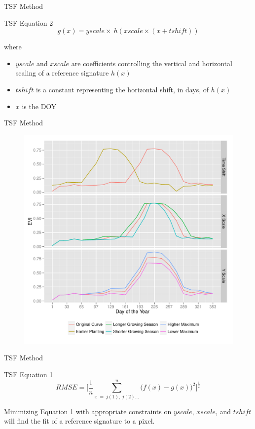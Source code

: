 \documentclass[  compress,xcolor={usenames,dvipsnames}]{beamer}
\begin{document}
\begin{frame}{TSF Method}
\begin{block}{TSF Equation 2}
  \begin{equation*}
    g(x) = yscale\times~h\left(xscale\times(x + tshift)\right)
  \end{equation*}
\end{block}
\vspace{0.5\baselineskip}
where
\begin{itemize}
  \item $yscale$ and  $xscale$ are coefficients controlling the vertical and horizontal scaling of a reference signature $h(x)$
  \item $tshift$ is a constant representing the horizontal shift, in days, of $h(x)$
  \item $x$ is the DOY
\end{itemize}
\end{frame}

\begin{frame}{TSF Method}
\begin{figure}
  \centering
  \includegraphics[width=0.7\linewidth]{Graphics/transformations.pdf}
\end{figure}
\end{frame}

\begin{frame}{TSF Method}
\begin{block}{TSF Equation 1}
  \begin{equation*}
    RMSE = \biggl[\frac{1}{n}\sum_{x\ =\ j(1),\ j(2)\ldots}^{n}\bigl(f\left(x\right)-g\left(x\right)\bigr)^{2}\biggr]^{\frac{1}{2}}
  \end{equation*}
\end{block}
\vspace{0.5\baselineskip}
Minimizing Equation 1 with appropriate constraints on $yscale$, $xscale$, and $tshift$ will find the fit of a reference signature to a pixel.

\end{frame}
\end{document}
